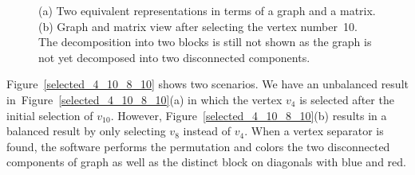 \documentclass[12pt, twoside,a4paper,toc=bibliography]{scrbook}
\newcommand{\figref}[1]{Figure~\protect\ref{#1}}
\begin{document}
\begin{figure}
\centering
{}
\hfill
{}
\caption{
(a) Two equivalent representations in terms of a graph and a matrix.
(b) Graph and matrix view after selecting the vertex number~10.
The decomposition into two blocks is still not shown as the graph is not yet
decomposed into two disconnected components.}
\label{initial_10}
\end{figure}

Figure~\ref{selected_4_10_8_10} shows two scenarios.
We have an unbalanced result in~\figref{selected_4_10_8_10}(a)
in which the vertex $v_4$ is selected after the initial selection of $v_10$.
However, \figref{selected_4_10_8_10}(b) results in a balanced result
by only selecting $v_8$ instead of $v_4$.
When a vertex separator is found, 
the software performs the permutation 
and colors the two disconnected components of graph
as well as the distinct block on diagonals with blue and red.
\end{document}
